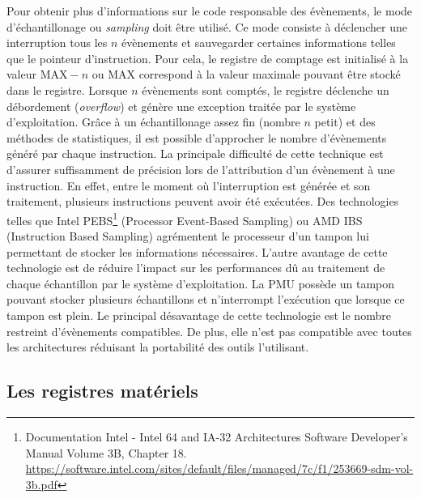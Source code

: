                 Pour obtenir plus d'informations sur le code responsable des évènements, le mode d'échantillonage ou \textit{sampling} doit être utilisé. Ce mode consiste à déclencher une interruption tous les $n$ évènements et sauvegarder certaines informations telles que le pointeur d'instruction. Pour cela, le registre de comptage est initialisé à la valeur $\text{MAX} - n$ ou $\text{MAX}$ correspond à la valeur maximale pouvant être stocké dans le registre. Lorsque $n$ évènements sont comptés, le registre déclenche un débordement (\textit{overflow}) et génère une exception traitée par le système d'exploitation. Grâce à un échantillonage assez fin (nombre $n$ petit) et des méthodes de statistiques, il est possible d'approcher le nombre d'évènements généré par chaque instruction. La principale difficulté de cette technique est d'assurer suffisamment de précision lors de l'attribution d'un évènement à une instruction. En effet, entre le moment où l'interruption est générée et son traitement, plusieurs instructions peuvent avoir été exécutées. Des technologies telles que Intel PEBS\footnote{Documentation Intel - Intel 64 and IA-32 Architectures Software Developer's Manual Volume 3B, Chapter 18. \url{https://software.intel.com/sites/default/files/managed/7c/f1/253669-sdm-vol-3b.pdf}} (Processor Event-Based Sampling) ou AMD IBS (Instruction Based Sampling) \cite{Drongowski2007} agrémentent le processeur d'un tampon lui permettant de stocker les informations nécessaires. L'autre avantage de cette technologie est de réduire l'impact sur les performances dû au traitement de chaque échantillon par le système d'exploitation. La PMU possède un tampon pouvant stocker plusieurs échantillons et n'interrompt l'exécution que lorsque ce tampon est plein. Le principal désavantage de cette technologie est le nombre restreint d'évènements compatibles. De plus, elle n'est pas compatible avec toutes les architectures réduisant la portabilité des outils l'utilisant.
       
    \subsection{Les registres matériels}\label{annexe:hc}
        
